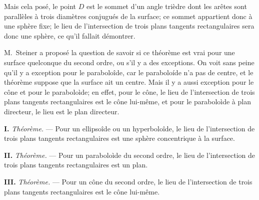 \documentclass[11pt,a4paper]{article}
\theoremstyle{definition}
\begin{document}
Mais cela pos\'e, le point $D$ est le sommet d'un angle tri\`edre dont les
ar\^etes sont parall\`eles \`a trois diam\`etres conjugu\'es de la surface;
ce sommet appartient donc \`a une sph\`ere fixe; le lieu de l'intersection
de trois plans tangents rectangulaires sera donc une sph\`ere, ce qu'il
fallait d\'emontrer.

M.~Steiner a propos\'e la question de savoir si ce th\'eor\`eme est vrai
pour une surface quelconque du second ordre, ou s'il y a des exceptions.
On voit sans peine qu'il y a exception pour le parabolo\^ide, car le
parabolo\'ide n'a pas de centre, et le th\'eor\`eme suppose que la surface
ait un centre. Mais il y a aussi exception pour le c\^one et pour le
parabolo\`ide; en effet, pour le c\^one, le lieu de l'intersection de trois
plans tangents rectangulaires est le c\^one lui-m\^eme, et pour le
parabolo\`ide \`a plan directeur, le lieu est le plan directeur.

\medskip

\textbf{I.} \textit{Th\'eor\`eme.} --- Pour un ellipso\^ide ou un hyperbolo\^ide,
le lieu de l'intersection de trois plans tangents rectangulaires est une
sph\`ere concentrique \`a la surface.

\medskip

\textbf{II.} \textit{Th\'eor\`eme.} --- Pour un parabolo\`ide du second ordre,
le lieu de l'intersection de trois plans tangents rectangulaires est un plan.

\medskip

\textbf{III.} \textit{Th\'eor\`eme.} --- Pour un c\^one du second ordre,
le lieu de l'intersection de trois plans tangents rectangulaires est le
c\^one lui-m\^eme.

\medskip
\end{document}
